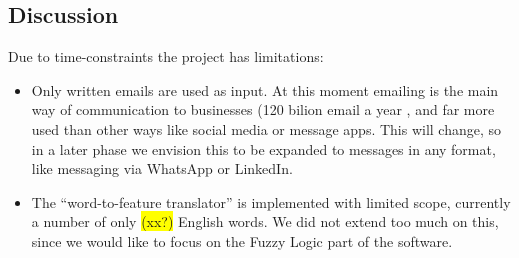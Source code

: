 \documentclass[journal]{IEEEtran}
\begin{document}
\subsection{Discussion}
Due to time-constraints the project has limitations:
\begin{itemize}
    \item Only written emails are used as input. At this moment emailing is the main way of communication to businesses (120 bilion email a year \cite{email_statistics}, and far more used than other ways like social media or message apps. This will change, so in a later phase we envision this to be expanded to messages in any format, like messaging via WhatsApp or LinkedIn.
    \item The ``word-to-feature translator'' is implemented with limited scope, currently a number of only \colorbox{yellow}{(xx?)} English words. We did not extend too much on this, since we would like to focus on the Fuzzy Logic part of the software.
\end{itemize}


\end{document}
